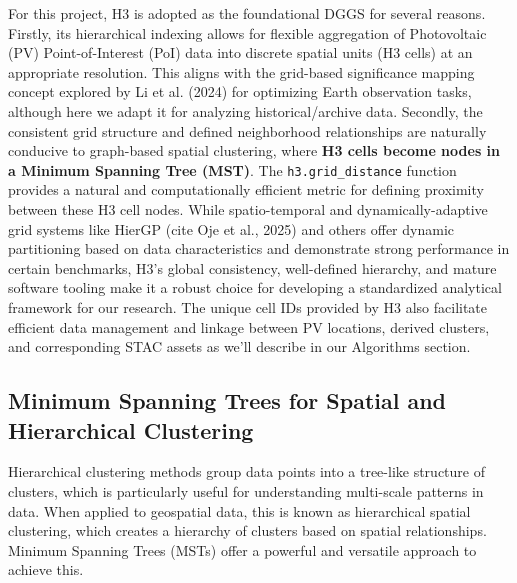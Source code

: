 \begin{multicols}{2}
For this project, H3 is adopted as the foundational DGGS for several reasons. Firstly, its hierarchical indexing allows for flexible aggregation of Photovoltaic (PV) Point-of-Interest (PoI) data into discrete spatial units (H3 cells) at an appropriate resolution. 
This aligns with the grid-based significance mapping concept explored by Li et al. (2024) for optimizing Earth observation tasks, although here we adapt it for analyzing historical/archive data. 
Secondly, the consistent grid structure and defined neighborhood relationships are naturally conducive to graph-based spatial clustering, where \textbf{H3 cells become nodes in a Minimum Spanning Tree (MST)}. 
The \texttt{h3.grid\_distance} function provides a natural and computationally efficient metric for defining proximity between these H3 cell nodes. 
While spatio-temporal and dynamically-adaptive grid systems like HierGP (cite Oje et al., 2025) and others offer dynamic partitioning based on data characteristics and demonstrate strong performance in certain benchmarks, H3's 
global consistency, well-defined hierarchy, and mature software tooling make it a robust choice for developing a standardized analytical framework for our research. 
The unique cell IDs provided by H3 also facilitate efficient data management and linkage between PV locations, derived clusters, and corresponding STAC assets as we'll describe in our Algorithms section.

\subsection{Minimum Spanning Trees for Spatial and Hierarchical Clustering}

Hierarchical clustering methods group data points into a tree-like structure of clusters, which is particularly useful for understanding multi-scale patterns in data. When applied to geospatial data, this is known as hierarchical spatial clustering, which creates a hierarchy of clusters based on spatial relationships. Minimum Spanning Trees (MSTs) offer a powerful and versatile approach to achieve this.


\end{multicols}
